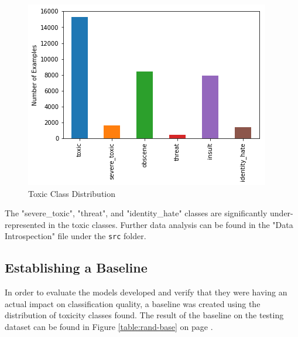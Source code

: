 \documentclass{article}
\begin{document}
{{	  \begin{figure}[h]
		  \centering
		  \includegraphics[width=\textwidth]{toxic-distribution.png}
		  \caption{Toxic Class Distribution}
		  \label{fig:toxic-dist}
	  \end{figure}
  }
  The "severe\_toxic", "threat", and "identity\_hate" classes are significantly
  under-represented in the toxic classes. Further data analysis can be found in
  the "Data Introspection" file under the \texttt{src} folder.

  \subsection{Establishing a Baseline}{
	  In order to evaluate the models developed and verify that they were having
	  an actual impact on classification quality, a baseline was created using the
	  distribution of toxicity classes found. The result of the baseline on the
	  testing dataset can be found in Figure \ref{table:rand-base} on page
	  \pageref{table:rand-base}.

}}
\end{document}
